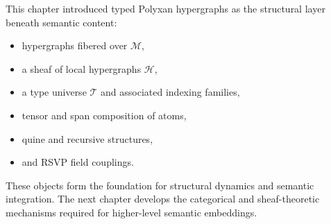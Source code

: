 This chapter introduced typed Polyxan hypergraphs as the structural layer
beneath semantic content:
\begin{itemize}
  \item hypergraphs fibered over $\mathcal{M}$,
  \item a sheaf of local hypergraphs $\mathscr{H}$,
  \item a type universe $\mathcal{T}$ and associated indexing families,
  \item tensor and span composition of atoms,
  \item quine and recursive structures,
  \item and RSVP field couplings.
\end{itemize}

These objects form the foundation for structural dynamics and semantic
integration. The next chapter develops the categorical and sheaf-theoretic
mechanisms required for higher-level semantic embeddings.
